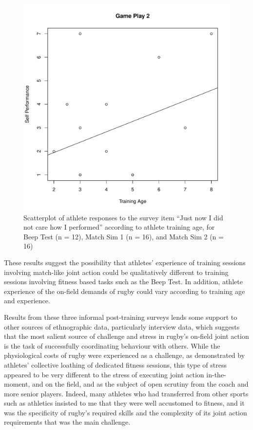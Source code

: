 \begin{CJK}{UTF8}{gbsn}
\begin{figure}[htbp]
\includegraphics[scale=.2]{images/indPerf0116TrainingAge.pdf}
  \caption{Scatterplot of athlete responses to the survey item ``Just now I did not care how I performed'' according to athlete training age, for Beep Test (n = 12), Match Sim 1 (n = 16), and Match Sim 2 (n = 16)}
  \label{fig:indPerfPostTraining}
\end{figure}

These results suggest the possibility that athletes' experience of training sessions involving match-like joint action could be qualitatively different to training sessions involving fitness based tasks such as the Beep Test.  In addition, athlete experience of the on-field demands of rugby could vary according to training age and experience.

Results from these three informal post-training surveys lends some support to other sources of ethnographic data, particularly interview data, which suggests that the most salient source of challenge and stress in rugby's on-field joint action is the task of successfully coordinating behaviour with others.  While the physiological costs of rugby were experienced as a challenge, as demonstrated by athletes' collective loathing of dedicated fitness sessions, this type of stress appeared to be very different to the stress of executing joint action in-the-moment, and on the field, and as the subject of open scrutiny from the coach and more senior players. Indeed, many athletes who had transferred from other sports such as athletics insisted to me that they were well accustomed to fitness, and it was the specificity of rugby's required skills and the complexity of its joint action requirements that was the main challenge.


\end{CJK}
